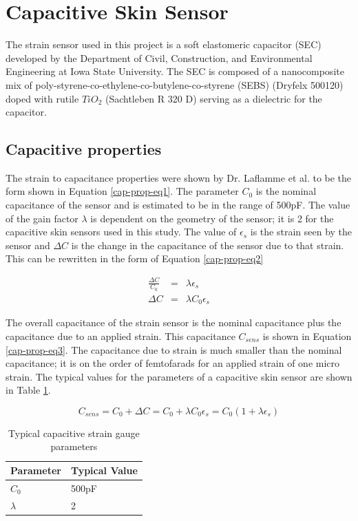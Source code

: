 \section{Capacitive Skin Sensor}
The strain sensor used in this project is a soft elastomeric capacitor (SEC) developed by the Department of Civil, Construction, and Environmental Engineering at Iowa State University.  The SEC is composed of a nanocomposite mix of poly-styrene-co-ethylene-co-butylene-co-styrene (SEBS) (Dryfelx 500120) doped with rutile $TiO_2$ (Sachtleben R 320 D) serving as a dielectric for the capacitor\cite{soft-elastomeric-capacitor}.

\subsection{Capacitive properties}
The strain to capacitance properties were shown by Dr. Laflamme et al. to be the form shown in Equation \ref{cap-prop-eq1}.  The parameter $C_0$ is the nominal capacitance of the sensor and is estimated to be in the range of 500pF.  The value of the gain factor $\lambda$ is dependent on the geometry of the sensor; it is 2 for the capacitive skin sensors used in this study.  The value of $\epsilon_s$ is the strain seen by the sensor and $\Delta C$ is the change in the capacitance of the sensor due to that strain.  This can be rewritten in the form of Equation \ref{cap-prop-eq2}

\begin{eqnarray}
	\frac{\Delta C}{C_0}&=&\lambda \epsilon_s\label{cap-prop-eq1}\\
	\Delta C &=& \lambda C_0 \epsilon_s\label{cap-prop-eq2}
\end{eqnarray}

The overall capacitance of the strain sensor is the nominal capacitance plus the capacitance due to an applied strain.  This capacitance $C_{sens}$ is shown in Equation \ref{cap-prop-eq3}.  The capacitance due to strain is much smaller than the nominal capacitance; it is on the order of femtofarads for an applied strain of one micro strain.  The typical values for the parameters of a capacitive skin sensor are shown in Table \ref{cap-strain-table}.

\begin{equation}
	C_{sens}=C_0+\Delta C=C_0+\lambda C_0\epsilon_s=C_0(1+\lambda\epsilon_s)\label{cap-prop-eq3}
\end{equation}

\begin{table}\centering
	\begin{tabular}{|l|l|}
		\hline
		Parameter & Typical Value\\
		\hline
		$C_0$ & 500pF\\
		$\lambda$ & 2\\
		\hline
	\end{tabular}
	\caption{Typical capacitive strain gauge parameters}\label{cap-strain-table}
\end{table}

